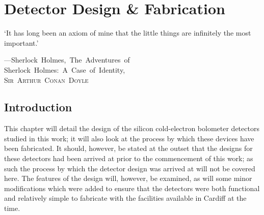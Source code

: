\chapter{Detector Design \& Fabrication}
\label{cha:Design}
\epigraph{`It has long been an axiom of mine that the little things are infinitely the most important.'}{\mbox{\textup{---Sherlock Holmes, The Adventures of}}\\ \mbox{\textup{Sherlock Holmes: A Case of Identity,}}\\ \mbox{\textup{\textsc{Sir Arthur Conan Doyle}}}}
%
\section{Introduction}\label{sec:deisgn_Introduction}
This chapter will detail the design of the silicon cold-electron bolometer detectors studied in this work; it will also look at the process by which these devices have been fabricated. It should, however, be stated at the outset that the designs for these detectors had been arrived at prior to the commencement of this work; as such the process by which the detector design was arrived at will not be covered here. The features of the design will, however, be examined, as will some minor modifications which were added to ensure that the detectors were both functional and relatively simple to fabricate with the facilities available in Cardiff at the time.
%
